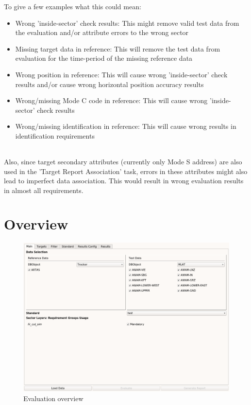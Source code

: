 To give a few examples what this could mean:
\begin{itemize}  
\item Wrong 'inside-sector' check results: This might remove valid test data from the evaluation and/or attribute errors to the wrong sector
\item Missing target data in reference: This will remove the test data from evaluation for the time-period of the missing reference data
\item Wrong position in reference: This will cause wrong 'inside-sector' check results and/or cause wrong horizontal position accuracy results
\item Wrong/missing Mode C code in reference: This will cause wrong 'inside-sector' check results
\item Wrong/missing identification in reference: This will cause wrong results in identification requirements
\end{itemize}
\ \\

Also, since target secondary attributes (currently only Mode S address) are also used in the 'Target Report Association' task, errors in these attributes might also lead to imperfect data association. This would result in wrong evaluation results in almost all requirements.

\section{Overview}
\label{sec:eval_overview} 

\begin{figure}[H]
  \hspace*{-2cm}
    \includegraphics[width=18cm,frame]{../screenshots/eval_overview.png}
  \caption{Evaluation overview}
\end{figure}


